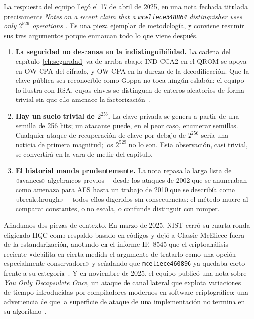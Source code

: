\documentclass[11pt,a4paper,oneside]{report}
\begin{document}
La respuesta del equipo llegó el 17 de abril de 2025, en una nota
fechada titulada precisamente \emph{Notes on a recent claim that a
\texttt{mceliece348864} distinguisher uses only $2^{529}$
operations}~\cite{cm529}. Es una pieza ejemplar de metodología, y
conviene resumir sus tres argumentos porque enmarcan todo lo que
viene después.

\begin{enumerate}[leftmargin=1.6em,itemsep=3pt]
  \item \textbf{La seguridad no descansa en la indistinguibilidad.}
        La cadena del capítulo~\ref{ch:seguridad} va de arriba
        abajo: IND-CCA2 en el QROM se apoya en OW-CPA del cifrado,
        y OW-CPA en la dureza de la decodificación. Que la clave
        pública sea reconocible como Goppa no toca ningún eslabón:
        el equipo lo ilustra con RSA, cuyas claves se distinguen de
        enteros aleatorios de forma trivial sin que ello amenace la
        factorización~\cite{cm529}.
  \item \textbf{Hay un suelo trivial de $2^{256}$.} La clave privada
        se genera a partir de una semilla de 256 bits; un atacante
        puede, en el peor caso, enumerar semillas. Cualquier ataque
        de recuperación de clave por debajo de $2^{256}$ sería una
        noticia de primera magnitud; los $2^{529}$ no lo son. Esta
        observación, casi trivial, se convertirá en la vara de medir
        del capítulo.
  \item \textbf{El historial manda prudentemente.} La nota repasa la
        larga lista de «avances» algebraicos previos ---desde los
        ataques de 2002 que se anunciaban como amenaza para AES
        hasta un trabajo de 2010 que se describía como
        «breakthrough»--- todos ellos digeridos sin consecuencias:
        el método muere al comparar constantes, o no escala, o
        confunde distinguir con romper.
\end{enumerate}

Añadamos dos piezas de contexto. En marzo de 2025, NIST cerró su
cuarta ronda eligiendo HQC como respaldo basado en códigos y dejó a
Classic McEliece fuera de la estandarización, anotando en el
informe IR~8545 que el criptoanálisis reciente «debilita en cierta
medida el argumento de tratarlo como una opción especialmente
conservadora» y señalando que \texttt{mceliece460896} ya quedaba
corto frente a su categoría~\cite{nist8545}. Y en noviembre de 2025,
el equipo publicó una nota sobre \emph{You Only Decapsulate Once},
un ataque de canal lateral que explota variaciones de tiempo
introducidas por compiladores modernos en software criptográfico:
una advertencia de que la superficie de ataque de una implementación
no termina en su algoritmo~\cite{cm2025yodo}.
\end{document}
